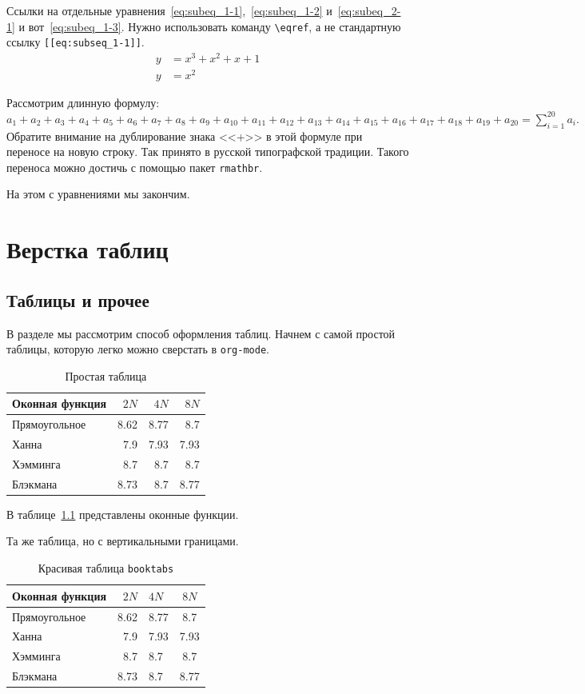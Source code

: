 \documentclass{cmcmsuthesis-phd}
\begin{document}
Ссылки на отдельные уравнения~\eqref{eq:subeq_1-1},~\eqref{eq:subeq_1-2} и~\eqref{eq:subeq_2-1} и вот~\eqref{eq:subeq_1-3}.
Нужно использовать команду \texttt{\textbackslash{}eqref}, а не стандартную ссылку \texttt{[[eq:subseq\_1-1]]}.
\begin{subequations}
\label{eq:subeq_2}
\begin{align}
        y & = x^3 + x^2 + x + 1\label{eq:subeq_2-1} \\
        y & = x^2
    \end{align}
\end{subequations}

Рассмотрим длинную формулу:
\(a_1+a_2+a_3+a_4+a_5+a_6+a_7+a_8+a_{9}+a_{10}+a_{11}+a_{12}+a_{13}+a_{14}+a_{15}+a_{16}+a_{17}+a_{18}+a_{19}+a_{20}=\sum_{i=1}^{20}a_{i}.\)
Обратите внимание на дублирование знака {}<<+>>{} в этой формуле при переносе на новую строку.
Так принято в русской типографской традиции.
Такого переноса можно достичь с помощью пакет \texttt{rmathbr}.

На этом с уравнениями мы закончим.
\chapter{Верстка таблиц}
\label{sec:org0ded324}
\section{Таблицы и прочее}
\label{sec:org9fcb0d7}
В разделе мы рассмотрим способ оформления таблиц.
Начнем с самой простой таблицы, которую легко можно сверстать в \texttt{org-mode}.
\begin{table}[htbp]
\caption{\label{tab:table1}Простая таблица}
\centering
\begin{tabular}{lrrr}
\hline
Оконная функция & \(2N\) & \(4N\) & \(8N\)\\
\hline
Прямоугольное & 8.62 & 8.77 & 8.7\\
\hline
Ханна & 7.9 & 7.93 & 7.93\\
\hline
Хэмминга & 8.7 & 8.7 & 8.7\\
\hline
Блэкмана & 8.73 & 8.7 & 8.77\\
\hline
\end{tabular}
\end{table}

В таблице~\ref{tab:table1} представлены оконные функции.

Та же таблица, но с вертикальными границами.

\begin{table}[htbp]
\caption{\label{tab:table2}Красивая таблица \texttt{booktabs}}
\centering
\begin{tabular}{|l|r|l|c|}
\toprule
\textbf{Оконная функция} & \textbf{\(2N\)} & \textbf{\(4N\)} & \textbf{\(8N\)}\\
\midrule
Прямоугольное & 8.62 & 8.77 & 8.7\\
Ханна & 7.9 & 7.93 & 7.93\\
Хэмминга & 8.7 & 8.7 & 8.7\\
Блэкмана & 8.73 & 8.7 & 8.77\\
\bottomrule
\end{tabular}
\end{table}
\end{document}

